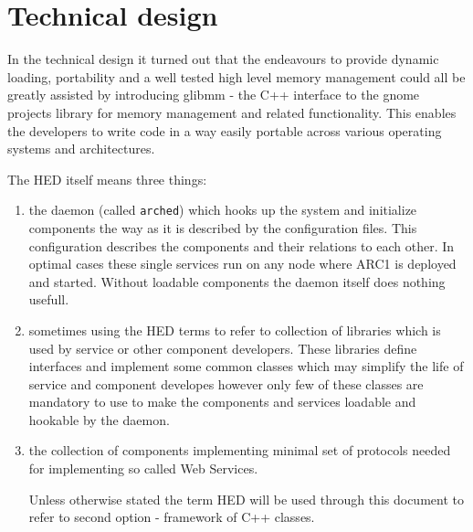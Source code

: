 \documentclass{book}
\begin{document}



\section{Technical design}

In the technical design it turned out that the endeavours to provide dynamic loading, portability and a well tested high level memory management could all be greatly assisted by introducing glibmm - the C++ interface to the gnome projects library for memory management and related functionality. This enables the developers to write code in a way easily portable across various operating systems and architectures.


The HED itself means three things:
\begin{enumerate}

\item the daemon (called \texttt{arched}) which hooks up the system and initialize components the way as it is described by the configuration files. This configuration describes the components and their relations to each other. In optimal cases these single services run on any node where ARC1 is deployed and started. Without loadable components the daemon itself does nothing usefull.

\item sometimes using the HED terms to refer to collection of libraries which is used by service or other component developers. These libraries define interfaces and implement some common classes which may simplify the life of service and component developes however only few of these classes are mandatory to use to make the components and services loadable and hookable by the daemon.

\item the collection of components implementing minimal set of protocols needed for implementing so called Web Services.

Unless otherwise stated the term HED will be used through this document to refer to second option - framework of C++ classes.

\end{enumerate}
\end{document}
